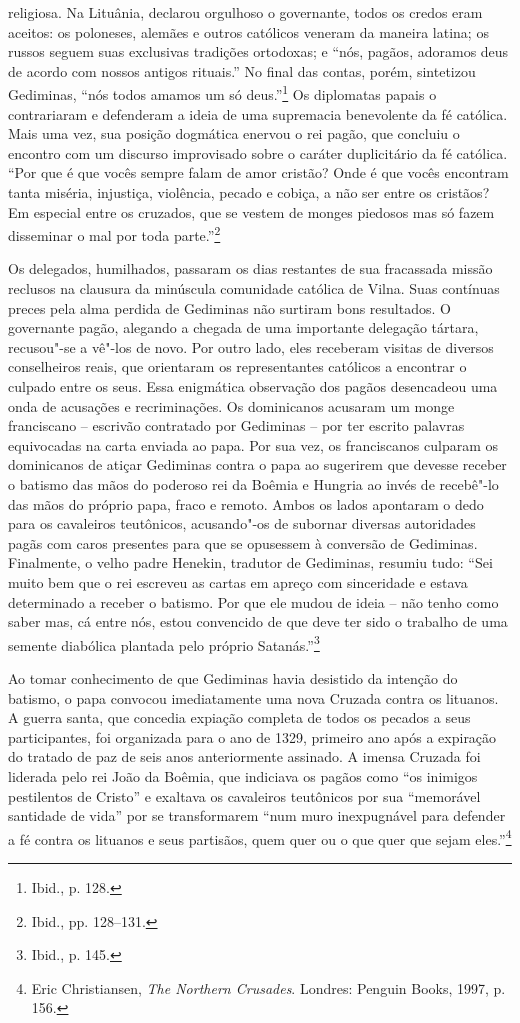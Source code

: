 religiosa. Na Lituânia, declarou orgulhoso o governante, todos os credos
eram aceitos: os poloneses, alemães e outros católicos veneram da
maneira latina; os russos seguem suas exclusivas tradições ortodoxas; e
``nós, pagãos, adoramos deus de acordo com nossos antigos rituais.'' No
final das contas, porém, sintetizou Gediminas, ``nós todos amamos um só
deus.''\footnote{Ibid., p. 128.} Os diplomatas papais o contrariaram e
defenderam a ideia de uma supremacia benevolente da fé católica. Mais
uma vez, sua posição dogmática enervou o rei pagão, que concluiu o
encontro com um discurso improvisado sobre o caráter duplicitário da fé
católica. ``Por que é que vocês sempre falam de amor cristão? Onde é que
vocês encontram tanta miséria, injustiça, violência, pecado e cobiça, a
não ser entre os cristãos? Em especial entre os cruzados, que se vestem
de monges piedosos mas só fazem disseminar o mal por toda
parte.''\footnote{Ibid., pp. 128--131.}

Os delegados, humilhados, passaram os dias restantes de sua fracassada
missão reclusos na clausura da minúscula comunidade católica de Vilna.
Suas contínuas preces pela alma perdida de Gediminas não surtiram bons
resultados. O governante pagão, alegando a chegada de uma importante
delegação tártara, recusou"-se a vê"-los de novo. Por outro lado, eles
receberam visitas de diversos conselheiros reais, que orientaram os
representantes católicos a encontrar o culpado entre os seus. Essa
enigmática observação dos pagãos desencadeou uma onda de acusações e
recriminações. Os dominicanos acusaram um monge franciscano -- escrivão
contratado por Gediminas -- por ter escrito palavras equivocadas na carta
enviada ao papa. Por sua vez, os franciscanos culparam os dominicanos de
atiçar Gediminas contra o papa ao sugerirem que devesse receber o
batismo das mãos do poderoso rei da Boêmia e Hungria ao invés de
recebê"-lo das mãos do próprio papa, fraco e remoto. Ambos os lados
apontaram o dedo para os cavaleiros teutônicos, acusando"-os de subornar
diversas autoridades pagãs com caros presentes para que se opusessem à
conversão de Gediminas. Finalmente, o velho padre Henekin, tradutor de
Gediminas, resumiu tudo: ``Sei muito bem que o rei escreveu as cartas em
apreço com sinceridade e estava determinado a receber o batismo. Por que
ele mudou de ideia -- não tenho como saber mas, cá entre nós, estou
convencido de que deve ter sido o trabalho de uma semente diabólica
plantada pelo próprio Satanás.''\footnote{Ibid., p. 145.}

Ao tomar conhecimento de que Gediminas havia desistido da intenção do
batismo, o papa convocou imediatamente uma nova Cruzada contra os
lituanos. A guerra santa, que concedia expiação completa de todos os
pecados a seus participantes, foi organizada para o ano de 1329,
primeiro ano após a expiração do tratado de paz de seis anos
anteriormente assinado. A imensa Cruzada foi liderada pelo rei João da
Boêmia, que indiciava os pagãos como ``os inimigos pestilentos de
Cristo'' e exaltava os cavaleiros teutônicos por sua ``memorável
santidade de vida'' por se transformarem ``num muro inexpugnável para
defender a fé contra os lituanos e seus partisãos, quem quer ou o que
quer que sejam eles.''\footnote{Eric Christiansen, \textit{The Northern Crusades}. Londres: Penguin Books, 1997, p. 156.}

